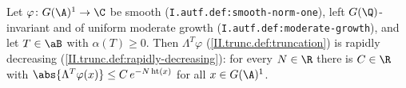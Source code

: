 Let $\varphi\colon G(\A)^1\to\C$ be smooth (\texttt{I.autf.def:smooth-norm-one}), left $G(\Q)$-invariant and of uniform moderate growth
(\texttt{I.autf.def:moderate-growth}), and let $T\in\aB$ with $\alpha(T)\ge0$. Then $\Lambda^T\varphi$ (\cref{II.trunc.def:truncation}) is rapidly decreasing
(\cref{II.trunc.def:rapidly-decreasing}): for every $N\in\R$ there is $C\in\R$ with $\abs{\Lambda^T\varphi(x)}\le C\,e^{-N\operatorname{ht}(x)}$ for all $x\in G(\A)^1$.
